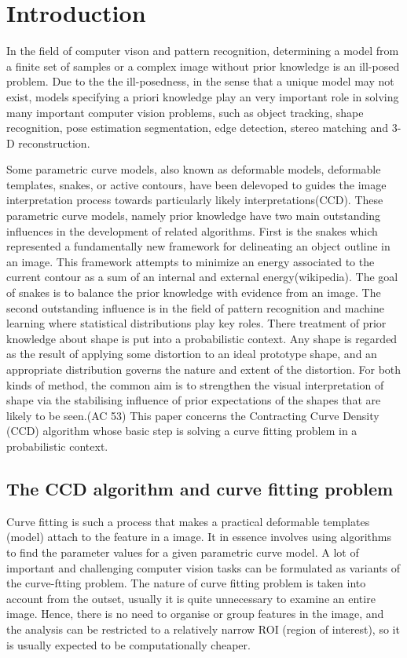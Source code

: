 \chapter{Introduction}
\label{chapter:Introduction}
In the field of computer vison and pattern recognition, determining a
model from a finite set of samples or a complex image without prior
knowledge is an ill-posed problem. Due to the the ill-posedness, in
the sense that a unique model may not exist, models specifying a priori
knowledge play an very important role in solving many important
computer vision problems, such as object tracking, shape recognition,
pose estimation segmentation, edge detection, stereo matching and 3-D
reconstruction.

Some parametric curve models, also known as deformable models,
deformable templates, snakes, or active contours, have been delevoped
to guides the image interpretation process towards particularly
likely interpretations(CCD). These parametric curve models, namely
prior knowledge have two main outstanding influences in the
development of related algorithms. First is the snakes which
represented a fundamentally new framework for delineating an object
outline in an image. This framework attempts to minimize an energy
associated to the current contour as a sum of an internal and external
energy(wikipedia). The goal of snakes is to balance the prior
knowledge with evidence from an image. The second outstanding
influence is in the field of pattern recognition and machine learning
where statistical distributions play key roles.  There treatment
of prior knowledge about shape is put into a probabilistic
context. Any shape is regarded as the result of applying some
distortion to an ideal prototype shape, and an appropriate
distribution governs the nature and extent of the distortion.
For both kinds of method, the common aim is to strengthen the visual
interpretation of shape via the stabilising influence of prior
expectations of the shapes that are likely to be seen.(AC 53) This
paper concerns the Contracting Curve Density (CCD) algorithm whose
basic step is solving a curve fitting problem in a probabilistic
context.


\section{The CCD algorithm and curve fitting problem}
\label{sec:ccdcfp}
Curve fitting is such a process that makes
a practical deformable templates (model) attach to the feature in a
image. It in essence involves using algorithms to find the parameter
values for a given parametric curve model. A lot of important and
challenging computer vision tasks can be formulated as variants of the
curve-ftting problem. The nature of curve fitting problem is taken into account from the
outset, usually it is quite unnecessary to examine an entire
image. Hence, there is no need to organise or group features in the
image, and the analysis can be restricted to a relatively narrow
ROI (region of interest), so it is usually expected to be computationally
cheaper.

